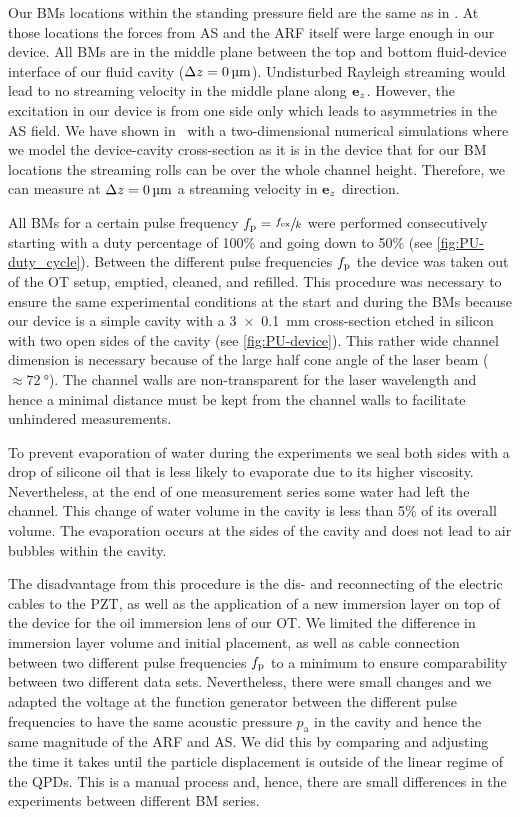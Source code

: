 Our BMs locations within the standing pressure field are the same as in 
\cite{Goering2021}. At those locations the forces from AS and the ARF itself 
were large enough in our device. All BMs are in the middle plane between the 
top and bottom fluid-device interface of our fluid cavity ($\Delta z = 
\SI{0}{\si{\micro\meter}}$).  Undisturbed Rayleigh streaming would lead to no streaming 
velocity in the middle plane along $\vb{e}_{z}$. However, the excitation in our device 
is from one side only which leads to asymmetries in the AS field. We have shown 
in~\cite{Goering2021} with a two-dimensional numerical simulations where we 
model the device-cavity cross-section as it is in the device that for our BM 
locations the streaming rolls can be over the whole channel height. Therefore, 
we can measure at $\Delta z = \SI{0}{\si{\micro\meter}}$ a streaming velocity in $\vb{e}_{z}$ direction.

All BMs for a certain pulse frequency $f_{\mathrm{p}}=\sfrac{f_{\mathrm{ex}}}{k}$ were performed 
consecutively starting with a duty percentage of 100\% and going down to 50\% 
(see \cref{fig:PU-duty_cycle}). Between the different pulse frequencies $f_{\mathrm{p}}$ the 
device was taken out of the OT setup, emptied, cleaned, and refilled. This 
procedure was necessary to ensure the same experimental conditions at the start 
and during the BMs because our device is a simple cavity with a 
\SI[product-units=single]{3 x 0.1}{\mm} cross-section etched in silicon with 
two open sides of the cavity (see \cref{fig:PU-device}). This rather wide channel 
dimension is necessary because of the large half cone angle of the laser beam 
($\approx \SI{72}{\degree}$). The channel walls are non-transparent for the 
laser wavelength and hence a minimal distance must be kept from the channel 
walls to facilitate unhindered measurements.

To prevent evaporation of water during the experiments we seal both sides with 
a drop of silicone oil that is less likely to evaporate due to its higher 
viscosity. Nevertheless, at the end of one measurement series some water had 
left the channel. This change of water volume in the cavity is less than 5\% of 
its overall volume. The evaporation occurs at the sides of the cavity and does 
not lead to air bubbles within the cavity.

The disadvantage from this procedure is the dis- and reconnecting of the 
electric cables to the PZT, as well as the application of a new immersion layer 
on top of the device for the oil immersion lens of our OT. We limited the 
difference in immersion layer volume and initial placement, as well as cable 
connection between two different pulse frequencies $f_{\mathrm{p}}$ to a minimum to ensure 
comparability between two different data sets. Nevertheless, there were small 
changes and we adapted the voltage at the function generator between the 
different pulse frequencies to have the same acoustic pressure $p_{\mathrm{a}}$ 
in the cavity and hence the same magnitude of the ARF and AS. We did this by 
comparing and adjusting the time it takes until the particle displacement is 
outside of the linear regime of the QPDs. This is a manual process and, hence, 
there are small differences in the experiments between different BM series.

